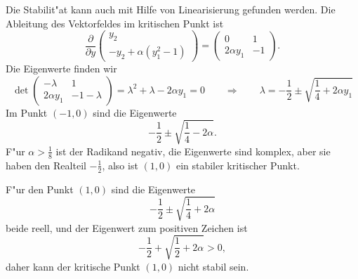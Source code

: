 \begin{loesung}
Die Stabilit"at kann auch mit Hilfe von Linearisierung gefunden
werden.
Die Ableitung des Vektorfeldes im kritischen Punkt ist
\[
\frac{\partial}{\partial y}
\begin{pmatrix}
y_2\\
-y_2+\alpha(y_1^2-1)
\end{pmatrix}
=
\begin{pmatrix}
   0        & 1\\
2\alpha y_1 &-1
\end{pmatrix}.
\]
Die Eigenwerte finden wir 
\[
\det
\begin{pmatrix}
   -\lambda & 1\\
2\alpha y_1 &-1-\lambda
\end{pmatrix}
=\lambda^2+\lambda -2\alpha y_1=0
\qquad\Rightarrow\qquad
\lambda = -\frac12\pm\sqrt{\frac14+2\alpha y_1}
\]
Im Punkt $(-1,0)$ sind die Eigenwerte
\[
-\frac12\pm\sqrt{\frac14-2\alpha}.
\]
F"ur $\alpha > \frac18$ ist der Radikand negativ, die Eigenwerte
sind komplex, aber sie haben den Realteil $-\frac12$, also ist
$(1,0)$ ein stabiler kritischer Punkt.

F"ur den Punkt $(1,0)$ sind die Eigenwerte
\[
-\frac12\pm\sqrt{\frac14+2\alpha}
\]
beide reell, und der Eigenwert zum positiven Zeichen ist
\[
-\frac12 + \sqrt{\frac12 + 2\alpha} > 0,
\]
daher kann der kritische Punkt $(1,0)$ nicht stabil sein.
\end{loesung}

